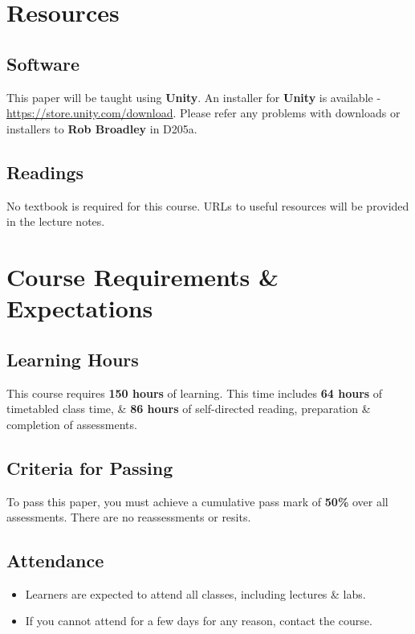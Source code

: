 \documentclass{article}
\begin{document}
\section*{Resources}

\subsection*{Software}
This paper will be taught using \textbf{Unity}. An installer for \textbf{Unity} is available - \href{https://store.unity.com/download}{https://store.unity.com/download}. Please refer any problems with downloads or installers to \textbf{Rob Broadley} in D205a.

\subsection*{Readings}
No textbook is required for this course. URLs to useful resources will be provided in the lecture notes.

\section*{Course Requirements \& Expectations}

\subsection*{Learning Hours}
This course requires \textbf{150 hours} of learning. This time includes \textbf{64 hours} of timetabled class time, \& \textbf{86 hours} of self-directed reading, preparation \& completion of assessments.

\subsection*{Criteria for Passing}
To pass this paper, you must achieve a cumulative pass mark of \textbf{50\%} over all assessments. There are no reassessments or resits.

\subsection*{Attendance}
\begin{itemize}
	\item Learners are expected to attend all classes, including lectures \& labs.
	\item If you cannot attend for a few days for any reason, contact the course.
\end{itemize}
\end{document}
